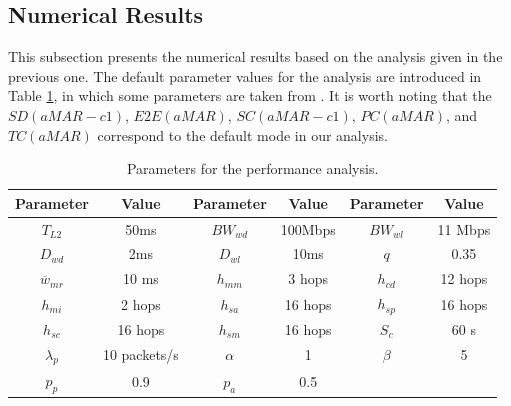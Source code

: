 \subsection{Numerical Results}
This subsection presents the numerical results based on the analysis given in the previous one. The default parameter values for the analysis are introduced in Table \ref{tap:c10_parameters}, in which some parameters are taken from \cite{dsrm}\cite{d4.4}. It is worth noting that the $SD (aMAR-c1)$, $E2E(aMAR)$, $SC(aMAR-c1)$, $PC(aMAR)$, and $TC(aMAR)$ correspond to the default mode in our analysis. \\

\begin{table}[ht]
\small
\caption{Parameters for the performance analysis.}
\label{tap:c10_parameters}
\centering
\begin{tabular}{|c |c |c |c |c |c |}
\hline
\textbf{Parameter} & \textbf{Value} & \textbf{Parameter} & \textbf{Value} & \textbf{Parameter} & \textbf{Value}  \\
\hline
$T_{L2}$ & 50ms & $BW_{wd}$  &  100Mbps & $BW_{wl}$  & 11 Mbps\\
\hline
  $D_{wd}$& 2ms  & $D_{wl}$ & 10ms & $q$& 0.35  \\
\hline
$\overline{w}_{mr}$&  10 ms  & $h_{mm}$ & 3 hops & $h_{cd}$&  12 hops  \\
\hline
$h_{mi}$& 2 hops  & $h_{sa}$& 16 hops  & $h_{sp}$&  16 hops   \\
\hline
 $h_{sc}$  & 16 hops   & $h_{sm}$&  16 hops &$S_{c} $&  60 s  \\
\hline
$\lambda_{p}$& 10 packets/s  & $\alpha$&  1 & $\beta $&  5  \\
\hline
$p_{p}$& 0.9  & $p_{a}$&  0.5 & & \\
\hline
\end{tabular}
\end{table}
\normalsize

